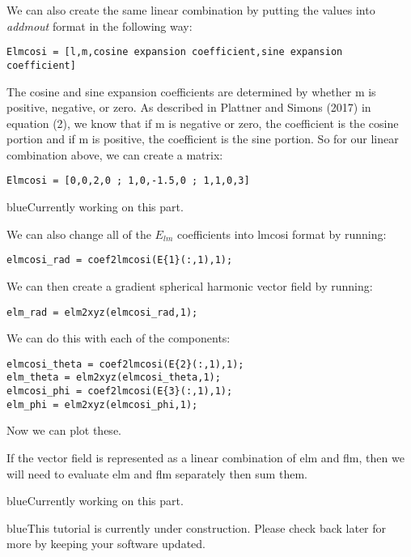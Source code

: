 \documentclass[11pt]{article}
\newcommand{\TAG}{\begin{color}{blue}This tutorial is currently under construction. Please check back later for more by keeping your software updated.\end{color}}
\newcommand{\HERE}{\begin{color}{blue}Currently working on this part.\end{color}}
\begin{document}
We can also create the same linear combination by putting the values into \textit{addmout} format in the following way:

\verb|Elmcosi = [l,m,cosine expansion coefficient,sine expansion coefficient]|

The cosine and sine expansion coefficients are determined by whether m is positive, negative, or zero.  As described in Plattner and Simons (2017) in equation (2), we know that if m is negative or zero, the coefficient is the cosine portion and if m is positive, the coefficient is the sine portion.  So for our linear combination above, we can create a matrix:

\verb|Elmcosi = [0,0,2,0 ; 1,0,-1.5,0 ; 1,1,0,3]|

\HERE

We can also change all of the $E_{lm}$ coefficients into lmcosi format by running:

\verb|elmcosi_rad = coef2lmcosi(E{1}(:,1),1);|

We can then create a gradient spherical harmonic vector field by running:

\verb|elm_rad = elm2xyz(elmcosi_rad,1);|

We can do this with each of the components:

\verb|elmcosi_theta = coef2lmcosi(E{2}(:,1),1);|\\
\verb|elm_theta = elm2xyz(elmcosi_theta,1);|\\
\verb|elmcosi_phi = coef2lmcosi(E{3}(:,1),1);|\\
\verb|elm_phi = elm2xyz(elmcosi_phi,1);|

Now we can plot these.


If the vector field is represented as a linear combination of elm and flm, then we will need to evaluate elm and flm separately then sum them.

\HERE

\TAG
\end{document}
